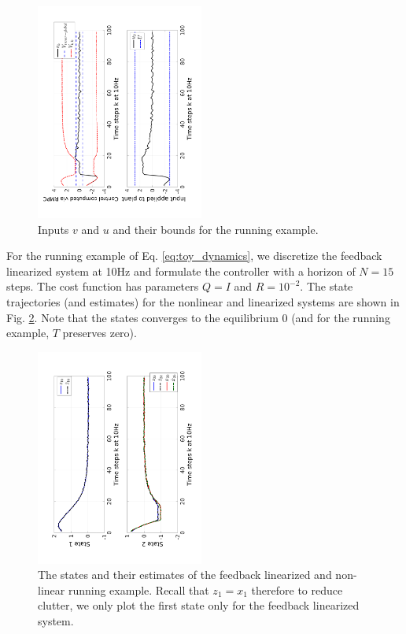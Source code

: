\begin{figure}
	\centering	
	\includegraphics[angle=270,width=0.49\textwidth]{figs/u_and_v_toy.pdf}
	\caption{Inputs $v$ and $u$ and their bounds for the running example.}
	\label{fig:input toy}
\end{figure}

For the running example of Eq. \ref{eq:toy_dynamics}, we discretize the feedback linearized system at 10Hz and formulate the controller with a horizon of $N=15$ steps. 
The cost function has parameters $Q=I$ and $R=10^{-2}$.
The state trajectories (and estimates) for the nonlinear and linearized systems are shown in Fig. \ref{fig:AllStates_toy}.
Note that the states converges to the equilibrium 0 (and for the running example, $T$ preserves zero). 

\begin{figure}
	\centering	
	\includegraphics[angle=270,width=0.49\textwidth]{figs/AllStates_toy.pdf}
	\caption{The states and their estimates of the feedback linearized and non-linear running example. Recall that $z_1 = x_1$ therefore to reduce clutter, we only plot the first state only for the feedback linearized system.}
	\label{fig:AllStates_toy}
\end{figure}




